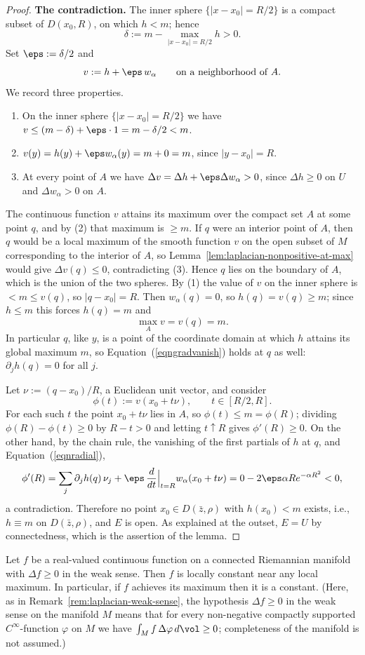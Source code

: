 \begin{proof}
{\bf The contradiction.} The inner sphere $\{|x-x_0|=R/2\}$ is a
compact subset of $D(x_0,R)$, on which $h<m$; hence
$$\delta:=m-\max_{|x-x_0|=R/2}h>0.$$
Set $\eps:=\delta/2$ and
$$v:=h+\eps\, w_\alpha\qquad\text{on a neighborhood of } A.$$
We record three properties.
\begin{enumerate}
\item On the inner sphere $\{|x-x_0|=R/2\}$ we have $v\le
(m-\delta)+\eps\cdot 1=m-\delta/2<m$.
\item $v(y)=h(y)+\eps w_\alpha(y)=m+0=m$, since $|y-x_0|=R$.
\item At every point of $A$ we have $\Delta v=\Delta
h+\eps\Delta w_\alpha>0$, since $\Delta h\ge0$ on $U$ and
$\Delta w_\alpha>0$ on $A$.
\end{enumerate}
The continuous function $v$ attains its maximum over the compact
set $A$ at some point $q$, and by (2) that maximum is $\ge m$. If
$q$ were an interior point of $A$, then $q$ would be a local
maximum of the smooth function $v$ on the open subset of $M$
corresponding to the interior of $A$, so
Lemma~\ref{lem:laplacian-nonpositive-at-max} would give $\Delta
v(q)\le0$, contradicting (3). Hence $q$ lies on the boundary of
$A$, which is the union of the two spheres. By (1) the value of
$v$ on the inner sphere is $<m\le v(q)$, so $|q-x_0|=R$. Then
$w_\alpha(q)=0$, so $h(q)=v(q)\ge m$; since $h\le m$ this forces
$h(q)=m$ and
$$\max_Av=v(q)=m.$$
In particular $q$, like $y$, is a point of the coordinate domain at
which $h$ attains its global maximum $m$, so
Equation~(\ref{eqngradvanish}) holds at $q$ as well:
$\partial_jh(q)=0$ for all $j$.

Let $\nu:=(q-x_0)/R$, a Euclidean unit vector, and consider
$$\phi(t):=v(x_0+t\nu),\qquad t\in[R/2,R].$$
For each such $t$ the point $x_0+t\nu$ lies in $A$, so $\phi(t)\le
m=\phi(R)$; dividing $\phi(R)-\phi(t)\ge0$ by $R-t>0$ and letting
$t\uparrow R$ gives $\phi'(R)\ge0$. On the other hand, by the
chain rule, the vanishing of the first partials of $h$ at $q$, and
Equation~(\ref{eqnradial}),
$$\phi'(R)=\sum_j\partial_jh(q)\,\nu_j+\eps\,
\frac{d}{dt}\Big|_{t=R}w_\alpha(x_0+t\nu)
=0-2\eps\alpha Re^{-\alpha R^2}<0,$$
a contradiction. Therefore no point $x_0\in D(\bar z,\rho)$ with
$h(x_0)<m$ exists, i.e., $h\equiv m$ on $D(\bar z,\rho)$, and $E$
is open. As explained at the outset, $E=U$ by connectedness, which
is the assertion of the lemma.
\end{proof}

\begin{theorem}
\label{thm:maximum-principle}
Let $f$ be a real-valued continuous function on a connected
Riemannian manifold with $\Delta f\ge 0$ in the weak sense. Then $f$
is locally constant near any local maximum. In particular, if $f$
achieves its maximum then it is a constant. (Here, as in
Remark~\ref{rem:laplacian-weak-sense}, the hypothesis $\Delta f\ge0$
in the weak sense on the manifold $M$ means that for every
non-negative compactly supported $C^\infty$-function $\varphi$ on
$M$ we have $\int_Mf\,\Delta\varphi\,d\vol\ge0$; completeness of
the manifold is not assumed.)
\end{theorem}

